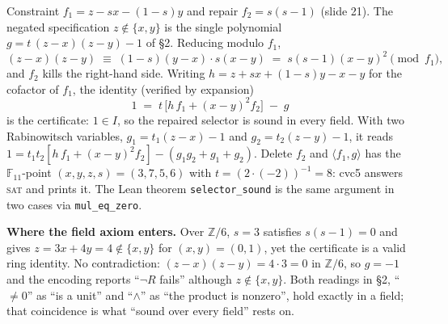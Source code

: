 \documentclass[10pt]{article}
\newcommand{\F}{\mathbb F}\newcommand{\wb}{\overline w}
\newcommand{\sect}[1]{\par\vspace{4pt}{\large\bfseries #1}\par\nobreak\vspace{1pt}}
\begin{document}
\sect{5. Worked example: the selector}
Constraint $f_1=z-sx-(1-s)y$ and repair $f_2=s(s-1)$ (slide 21). The negated specification $z\notin\{x,y\}$ is the single
polynomial $g=t\,(z-x)(z-y)-1$ of \S2. Reducing modulo $f_1$,
\[
(z-x)(z-y)\;\equiv\;(1-s)(y-x)\cdot s(x-y)\;=\;s(s-1)(x-y)^2 \pmod{f_1},
\]
and $f_2$ kills the right-hand side. Writing $h=z+sx+(1-s)y-x-y$ for the cofactor of $f_1$, the identity (verified by expansion)
\[
\boxed{\;1\;=\;t\,\bigl[h\,f_1+(x-y)^2 f_2\bigr]\;-\;g\;}
\]
is the certificate: $1\in I$, so the repaired selector is sound in every field. With two Rabinowitsch variables,
$g_1=t_1(z-x)-1$ and $g_2=t_2(z-y)-1$, it reads $1=t_1t_2[h\,f_1+(x-y)^2f_2]-(g_1g_2+g_1+g_2)$. Delete $f_2$ and
$\langle f_1,g\rangle$ has the $\F_{11}$-point $(x,y,z,s)=(3,7,5,6)$ with $t=(2\cdot(-2))^{-1}=8$: cvc5 answers \textsc{sat} and
prints it. The Lean theorem \texttt{selector\_sound} is the same argument in two cases via \texttt{mul\_eq\_zero}.
\par\textbf{Where the field axiom enters.} Over $\mathbb Z/6$, $s=3$ satisfies $s(s-1)=0$ and gives $z=3x+4y=4\notin\{x,y\}$ for
$(x,y)=(0,1)$, yet the certificate is a valid ring identity. No contradiction: $(z-x)(z-y)=4\cdot3=0$ in $\mathbb Z/6$, so $g=-1$
and the encoding reports ``$\neg R$ fails'' although $z\notin\{x,y\}$. Both readings in \S2, ``$\neq0$'' as ``is a unit'' and
``$\wedge$'' as ``the product is nonzero'', hold exactly in a field; that coincidence is what ``sound over every field'' rests on.
\end{document}
